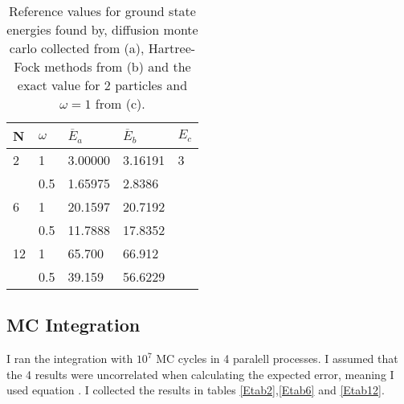\documentclass[a4paper,English,10pt]{article}
\renewcommand{\bar}{\overline}
\begin{document}
\begin{table}
  \centering
  \caption[Reference energies]{Reference values for ground state energies found by, diffusion monte carlo  collected from \cite{mortenref} (a), Hartree-Fock
    methods from \cite{proj1} (b) and the exact value for 2 particles and $\omega = 1$ from \cite{taut} (c).}
  \label{tabMref}
  \begin{tabular}{lllll}
    \toprule
    N&$\omega$&$\bar{E}_{a}$&$\bar{E}_b$&$E_c$\\
    \midrule
    2&1&3.00000 &3.16191 & 3\\
    &0.5&1.65975& 2.8386&\\
    6&1&20.1597&20.7192&\\
    &0.5&11.7888&17.8352&\\
    12&1&65.700&66.912&\\
    &0.5&39.159&56.6229&\\
    \bottomrule
  \end{tabular}
\end{table}

\subsection{MC Integration}
I ran the integration with $10^7$ MC cycles in 4 paralell processes. I assumed that the 4 results were uncorrelated when calculating the expected error, meaning I used equation
\label{errorprop}. I collected the results in tables \ref{Etab2},\ref{Etab6} and \ref{Etab12}.
\end{document}
